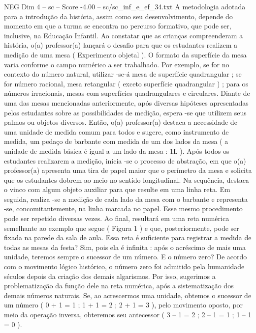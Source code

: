 \begin{textsample}{NEG Dim 4 – sc – Score -4.00 – sc/sc\_inf\_e\_ef\_34.txt}  \label{ex:f4_neg_252}
A metodologia adotada para a introdução da história, assim como seu desenvolvimento, depende do momento em que a turma se encontra no percurso formativo, que pode ser, inclusive, na Educação Infantil.
Ao constatar que as crianças compreenderam a história, o(a) professor(a) lançará o desafio para que os estudantes realizem a medição de uma mesa ( Experimento objetal ).
O formato da superfície da mesa varia conforme o campo numérico a ser trabalhado.
Por exemplo, se for no contexto do número natural, utilizar -se-á mesa de superfície quadrangular ; se for número racional, mesa retangular ( exceto superfície quadrangular ) ; para os números irracionais, mesas com superfícies quadrangulares e circulares.
Diante de uma das mesas mencionadas anteriormente, após diversas hipóteses apresentadas pelos estudantes sobre as possibilidades de medição, espera -se que utilizem seus palmos ou objetos diversos.
Então, o(a) professor(a) destaca a necessidade de uma unidade de medida comum para todos e sugere, como instrumento de medida, um pedaço de barbante com medida de um dos lados da mesa ( a unidade de medida básica é igual a um lado da mesa : 1L ).
Após todos os estudantes realizarem a medição, inicia -se o processo de abstração, em que o(a) professor(a) apresenta uma tira de papel maior que o perímetro da mesa e solicita que os estudantes dobrem ao meio no sentido longitudinal.
Na sequência, destaca o vinco com algum objeto auxiliar para que resulte em uma linha reta.
Em seguida, realiza -se a medição de cada lado da mesa com o barbante e representa -se, concomitantemente, na linha marcada no papel.
Esse mesmo procedimento pode ser repetido diversas vezes.
Ao final, resultará em uma reta numérica semelhante ao exemplo que segue ( Figura 1 ) e que, posteriormente, pode ser fixada na parede da sala de aula.
Essa reta é suficiente para registrar a medida de todas as mesas da festa?
Sim, pois ela é infinita : após o acréscimo de mais uma unidade, teremos sempre o sucessor de um número.
E o número zero?
De acordo com o movimento lógico histórico, o número zero foi admitido pela humanidade séculos depois da criação dos demais algarismos.
Por isso, sugerimos a problematização da função dele na reta numérica, após a sistematização dos demais números naturais.
Se, ao acrescermos uma unidade, obtemos o sucessor de um número ( 0 + 1 = 1 ; 1 + 1 = 2 ; 2 + 1 = 3 ), pelo movimento oposto, por meio da operação inversa, obteremos seu antecessor ( 3 – 1 = 2 ; 2 – 1 = 1 ; 1 – 1 = 0 ).

\end{textsample}
